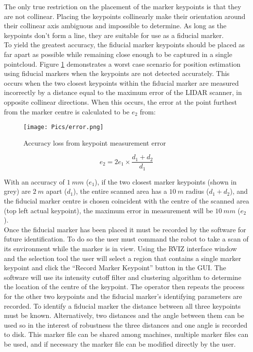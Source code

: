 The only true restriction on the placement of the marker keypoints is that they are not collinear. Placing the keypoints collinearly make their orientation around their collinear axis ambiguous and impossible to determine. As long as the keypoints don't form a line, they are suitable for use as a fiducial marker.\\

To yield the greatest accuracy, the fiducial marker keypoints should be placed as far apart as possible while remaining close enough to be captured in a single pointcloud. Figure \ref{fig:resacc} demonstrates a worst case scenario for position estimation using fiducial markers when the keypoints are not detected accurately. This occurs when the two closest keypoints within the fiducial marker are measured incorrectly by a distance equal to the maximum error of the LIDAR scanner, in opposite collinear directions. When this occurs, the error at the point furthest from the marker centre is calculated to be $e_2$ from:

\begin{figure}
\texttt{[image: Pics/error.png]}
\caption{Accuracy loss from keypoint measurement error}
\label{fig:resacc} 
\end{figure}

\begin{equation}
   e_2 = 2e_1\times\frac{d_1+d_2}{d_1}\label{eq:2}
\end{equation}

With an accuracy of $1\ mm$ ($e_1$), if the two closest marker keypoints (shown in grey) are $2\ m$ apart ($d_1$), the entire scanned area has a $10\ m$ radius ($d_1+d_2$), and the fiducial marker centre is chosen coincident with the centre of the scanned area (top left actual keypoint), the maximum error in measurement will be $10\ mm$ ($e_2$).\\

Once the fiducial marker has been placed it must be recorded by the software for future identification. To do so the user must command the robot to take a scan of its environment while the marker is in view. Using the RVIZ interface window and the selection tool the user will select a region that contains a single marker keypoint and click the ``Record Marker Keypoint'' button in the GUI. The software will use its intensity cutoff filter and clustering algorithm to determine the location of the centre of the keypoint. The operator then repeats the process for the other two keypoints and the fiducial marker's identifying parameters are recorded. To identify a fiducial marker the distance between all three keypoints must be known. Alternatively, two distances and the angle between them can be used so in the interest of robustness the three distances and one angle is recorded to disk. This marker file can be shared among machines, multiple marker files can be used, and if necessary the marker file can be modified directly by the user.\\

